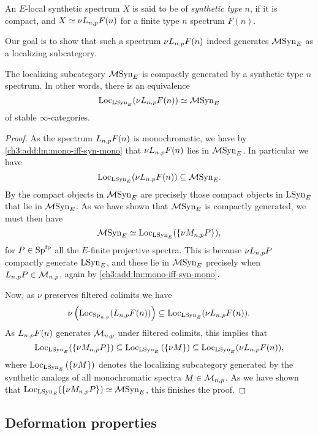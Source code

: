 \begin{definition}
    An $E$-local synthetic spectrum $X$ is said to be of \emph{synthetic type} $n$, if it is compact, and $X\simeq \nu L_{n,p} F(n)$ for a finite type $n$ spectrum $F(n)$. 
\end{definition}

Our goal is to show that such a spectrum $\nu L_{n,p} F(n)$ indeed generates $\mathcal{M}\mathrm{Syn}_{E}$ as a localizing subcategory. 

\begin{lemma}
    \label{ch3:add:monochromatic-synthetic-is-gen-by-type-n}
    The localizing subcategory $\mathcal{M}\mathrm{Syn}_{E}$ is compactly generated by a synthetic type $n$ spectrum. In other words, there is an equivalence 
    \[\operatorname{Loc}_{\mathrm{LSyn}_{E}}(\nu L_{n,p} F(n))\simeq \mathcal{M}\mathrm{Syn}_{E}\]
    of stable $\infty$-categories. 
\end{lemma}
\begin{proof}
    As the spectrum $L_{n,p} F(n)$ is monochromatic, we have by \cref{ch3:add:lm:mono-iff-syn-mono} that $\nu L_{n,p} F(n)$ lies in $\mathcal{M}\mathrm{Syn}_{E}$. In particular we have 
    \[\operatorname{Loc}_{\mathrm{LSyn}_{E}}(\nu L_{n,p} F(n))\subseteq \mathcal{M}\mathrm{Syn}_{E}.\]
    By \cite[2.2]{neeman_1992} the compact objects in $\mathcal{M}\mathrm{Syn}_{E}$ are precisely those compact objects in $\mathrm{LSyn}_{E}$ that lie in $\mathcal{M}\mathrm{Syn}_{E}$. As we have shown that $\mathcal{M}\mathrm{Syn}_{E}$ is compactly generated, we must then have 
    \[\mathcal{M}\mathrm{Syn}_{E} \simeq \operatorname{Loc}_{\mathrm{LSyn}_{E}}(\{\nu M_{n,p} P\}),\]
    for $P \in \mathrm{Sp}^{\mathrm{fp}}$ all the $E$-finite projective spectra. This is because $\nu L_{n,p} P$ compactly generate $\mathrm{LSyn}_{E}$, and these lie in $\mathcal{M}\mathrm{Syn}_{E}$ precisely when $L_{n,p} P\in \mathcal{M}_{n,p}$, again by \cref{ch3:add:lm:mono-iff-syn-mono}. 

    Now, as $\nu$ preserves filtered colimits we have 
    \[\nu \left(\operatorname{Loc}_{\mathrm{Sp}_{n,p}}(L_{n,p} F(n))\right)\subseteq \operatorname{Loc}_{\mathrm{LSyn}_{E}}(\nu L_{n,p} F(n)).\]
    As $L_{n,p} F(n)$ generates $\mathcal{M}_{n,p}$ under filtered colimits, this implies that 
    \[\operatorname{Loc}_{\mathrm{LSyn}_{E}}(\{\nu M_{n,p} P\})\subseteq \operatorname{Loc}_{\mathrm{LSyn}_{E}}\left(\{\nu M\}\right) \subseteq \operatorname{Loc}_{\mathrm{LSyn}_{E}}(\nu L_{n,p} F(n)),\]
    where $\operatorname{Loc}_{\mathrm{LSyn}_{E}}\left(\{\nu M\}\right)$ denotes the localizing subcategory generated by the synthetic analogs of all monochromatic spectra $M\in \mathcal{M}_{n,p}$. As we have shown that $\operatorname{Loc}_{\mathrm{LSyn}_{E}}(\{\nu M_{n,p} P\})\simeq \mathcal{M}\mathrm{Syn}_{E}$, this finishes the proof. 
\end{proof}



\subsection{Deformation properties}

